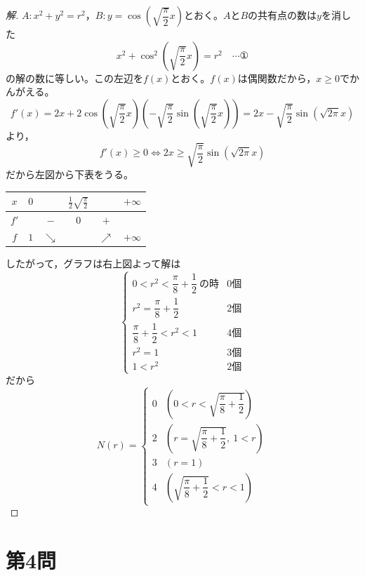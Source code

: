 \documentclass[../main.tex]{subfiles}
\begin{document}
\begin{proof}[解]
  $A: x^2+y^2=r^2$，$B: y=\cos\left(\sqrt{\dfrac{\pi}{2}}x\right)$とおく。$A$と$B$の共有点の数は$y$を消した
  \[
    x^2+\cos^2\left(\sqrt{\frac{\pi}{2}}x\right)=r^2 \quad\cdots\text{①}
  \]
  の解の数に等しい。この左辺を$f(x)$とおく。$f(x)$は偶関数だから，$x\ge0$でかんがえる。
  \[
    f'(x)=2x+2\cos\left(\sqrt{\frac{\pi}{2}}x\right)\left(-\sqrt{\frac{\pi}{2}}\sin\left(\sqrt{\frac{\pi}{2}}x\right)\right)=2x-\sqrt{\frac{\pi}{2}}\sin\left(\sqrt{2\pi}x\right)
  \]
  より，
  \[
    f'(x)\ge0 \iff 2x\ge\sqrt{\frac{\pi}{2}}\sin\left(\sqrt{2\pi}x\right)
  \]
  だから左図から下表をうる。
  \begin{center}
    \begin{tabular}{c|ccccc}
      $x$ & $0$ & & $\frac12\sqrt{\frac{\pi}{2}}$ & & $+\infty$ \\
      \hline
      $f'$ & & $-$ & $0$ & $+$ & \\
      \hline
      $f$ & $1$ & $\searrow$ & & $\nearrow$ & $+\infty$
    \end{tabular}
  \end{center}
  したがって，グラフは右上図よって解は
  \[
    \begin{cases}
      0<r^2<\dfrac{\pi}{8}+\dfrac12\ \text{の時} & 0\text{個} \\
      r^2=\dfrac{\pi}{8}+\dfrac12 & 2\text{個} \\
      \dfrac{\pi}{8}+\dfrac12<r^2<1 & 4\text{個} \\
      r^2=1 & 3\text{個} \\
      1<r^2 & 2\text{個}
    \end{cases}
  \]
  だから
  \[
    N(r)=
    \begin{cases}
      0 & \left(0<r<\sqrt{\dfrac{\pi}{8}+\dfrac12}\right) \\
      2 & \left(r=\sqrt{\dfrac{\pi}{8}+\dfrac12},\ 1<r\right) \\
      3 & (r=1) \\
      4 & \left(\sqrt{\dfrac{\pi}{8}+\dfrac12}<r<1\right)
    \end{cases}
  \]
\end{proof}

\newpage

\section*{第4問}
\end{document}
